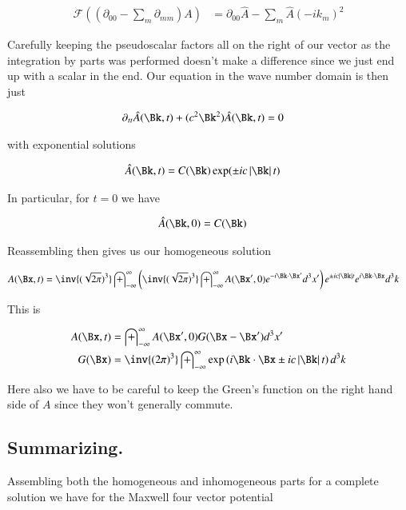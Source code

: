 \documentclass{article}
\newcommand{\FF}[0]{\mathcal{F}}
\newcommand{\IIinf}[0]{ \int_{-\infty}^\infty }
\begin{document}
\begin{align*}
\FF((\partial_{00} - \sum_m \partial_{mm}) A)
&= \partial_{00} \hat{A} - \sum_m \hat{A} (-i k_m)^2 
\end{align*}

Carefully keeping the pseudoscalar factors all on the right of our vector as the integration by parts was performed doesn't make a difference since we just end up with a scalar in the end.  Our equation in the wave number domain is then just

\begin{align*}
\partial_{tt} \hat{A}(\Bk,t) + (c^2 \Bk^2) \hat{A}(\Bk,t) &= 0 %
\end{align*}

with exponential solutions

\begin{align*}
\hat{A}(\Bk, t) &= C(\Bk) \exp(\pm i c \Abs{\Bk} t)
\end{align*}

In particular, for $t = 0$ we have

\begin{align*}
\hat{A}(\Bk, 0) &= C(\Bk)
\end{align*}

Reassembling then gives us our homogeneous solution

\begin{align*}
{A}(\Bx, t)
&= 
\inv{(\sqrt{2\pi})^3} \IIinf 
\left( \inv{(\sqrt{2\pi})^3} \IIinf A(\Bx', 0) e^{ -i \Bk \cdot \Bx' } d^3 x' \right) e^{\pm i c \Abs{\Bk} t}
e^{ i \Bk \cdot \Bx } d^3 k
\end{align*}

This is

\begin{align}\label{eqn:potentialHomogeneous}
{A}(\Bx, t) &= \IIinf A(\Bx', 0) G( \Bx - \Bx' ) d^3 x' \\
G(\Bx) &= \inv{({2\pi})^3} \IIinf \exp\left( i \Bk \cdot \Bx \pm i c \Abs{\Bk} t \right) d^3 k
\end{align}

Here also we have to be careful to keep the Green's function on the right hand side of $A$ since they 
won't generally commute.

\subsection{ Summarizing. }

Assembling both the homogeneous and inhomogeneous parts for a complete solution we have for the Maxwell
four vector potential
\end{document}
